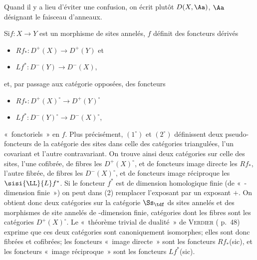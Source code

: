 \documentclass[10pt]{../fichiers-configuration-latex/smfart}
\begin{document}
Quand il y a lieu d'éviter une confusion, on écrit plutôt
$D(X,\Aa)$, $\Aa$ désignant le faisceau d'anneaux.

Si\pageoriginale $f:X\rightarrow Y$ est un morphisme de sites annelés,
$f$ définit des foncteurs dérivés
\begin{itemize}
\item[(1)] $Rf_{\ast}:D^{+}(X)\rightarrow D^{+}(Y)$ et

\item[(2)] $Lf^{\ast}:D^{-}(Y)\rightarrow D^{-}(X)$,
\end{itemize}
et, par passage aux catégorie opposées, des foncteurs
\begin{itemize}
\item[$\rm(1^{\circ})$] $Rf_{\ast}:D^{+}(X)^{\circ}\rightarrow
D^{+}(Y)^{\circ}$

\item[$\rm(2^{\circ})$] $Lf^{\ast}:D^{-}(Y)^{\circ}\rightarrow
D^{-}(X)^{\circ}$,
\end{itemize}
« fonctoriels »  en $f$. Plus précisément, $(1^{\circ})$ et
$(2^{\circ})$ définissent deux pseudo-foncteurs de la catégorie des
sites dans celle des catégories triangulées, l'un covariant et l'autre
contravariant. On trouve ainsi deux catégories sur celle des sites,
l'une cofibrée, de fibres les $D^{+}(X)^{\circ}$, et de foncteurs
image directe les $Rf_{\ast}$, l'autre fibrée, de fibres les
$D^{-}(X)^{\circ}$, et de foncteurs image réciproque les
$\sisi{\LL}{L} f^{\ast}$. Si le foncteur $f^{\ast}$ est de dimension
homologique finie (\ie de « \tTor-dimension finie ») on peut dans
(2) remplacer l'exposant par un exposant $+$. On obtient donc deux
catégories sur la catégorie $\Ss_{\tdf}$ ds sites annelés et
des morphismes de site annelés de \tTor-dimension finie, catégories dont
les fibres sont les catégories $D^{+}(X)^{\circ}$. Le « théorème
trivial de dualité »  de \textsc{Verdier} (\cite{SGA4-17:CD} p.~48) exprime que ces deux
catégories sont canoniquement isomorphes; elles sont donc fibrées et
cofibrées; les foncteurs « image directe »  sont les foncteurs
$Rf_{\ast}$\sisi{}{ }(sic), et les foncteurs « image réciproque »  sont les
foncteurs $Lf^{\ast}$\sisi{}{ }(sic).

\setcounter{subsection}{1}
\setcounter{subsubsection}{1}
\subsubsection{}
\end{document}
